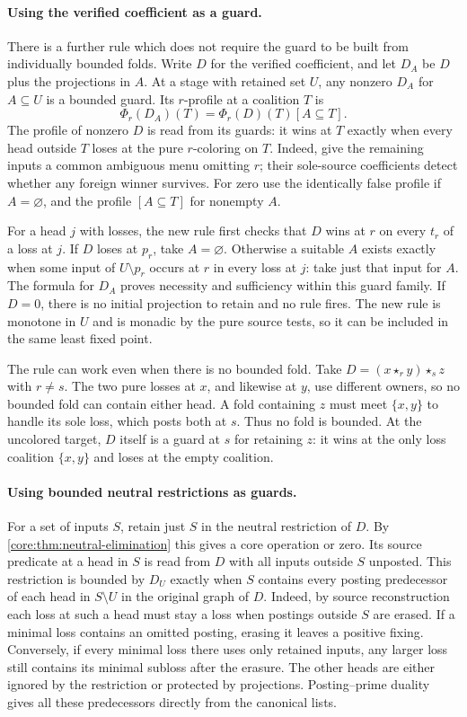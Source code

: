 \paragraph{Using the verified coefficient as a guard.}
There is a further rule which does not require the guard
to be built from individually bounded folds. Write $D$
for the verified coefficient, and let $D_A$ be $D$ plus
the projections in $A$. At a stage with retained set
$U$, any nonzero $D_A$ for $A\subseteq U$ is a bounded
guard. Its $r$-profile at a coalition $T$ is
\[
             \Phi_r(D_A)(T)=\Phi_r(D)(T)[A\subseteq T].
\]
The profile of nonzero $D$ is read from its guards:
it wins at $T$ exactly when every head outside $T$
loses at the pure $r$-coloring on $T$. Indeed, give
the remaining inputs a common ambiguous menu omitting
$r$; their sole-source coefficients detect whether any
foreign winner survives. For zero use the identically
false profile if $A=\varnothing$, and the profile
$[A\subseteq T]$ for nonempty $A$.

For a head $j$ with losses, the new rule first checks
that $D$ wins at $r$ on every $t_r$ of a loss at $j$.
If $D$ loses at $p_r$, take $A=\varnothing$.
Otherwise a suitable $A$ exists exactly when some
input of $U\setminus p_r$ occurs at $r$ in every
loss at $j$: take just that input for $A$.
The formula for $D_A$ proves necessity and sufficiency
within this guard family. If $D=0$, there is no initial
projection to retain and no rule fires. The new rule is
monotone in $U$ and is monadic by the pure source tests,
so it can be included in the same least fixed point.

The rule can work even when there is no bounded fold.
Take $D=(x\star_r y)\star_s z$ with $r\ne s$. The two
pure losses at $x$, and likewise at $y$, use different
owners, so no bounded fold can contain either head.
A fold containing $z$ must meet $\{x,y\}$ to handle
its sole loss, which posts both at $s$. Thus no fold
is bounded. At the uncolored target, $D$ itself is a
guard at $s$ for retaining $z$: it wins at the only
loss coalition $\{x,y\}$ and loses at the empty
coalition.

\paragraph{Using bounded neutral restrictions as guards.}
For a set of inputs $S$, retain just $S$ in the neutral
restriction of $D$. By \cref{core:thm:neutral-elimination}
this gives a core operation or zero. Its source predicate
at a head in $S$ is read from $D$ with all inputs outside
$S$ unposted. This restriction is bounded by $D_U$
exactly when $S$ contains every posting predecessor of
each head in $S\setminus U$ in the original graph of $D$.
Indeed, by source reconstruction each loss at such a head
must stay a loss when postings outside $S$ are erased.
If a minimal loss contains an omitted posting, erasing it
leaves a positive fixing. Conversely, if every minimal
loss there uses only retained inputs, any larger loss
still contains its minimal subloss after the erasure.
The other heads are either ignored by the restriction or
protected by projections. Posting--prime duality gives all
these predecessors directly from the canonical lists.

